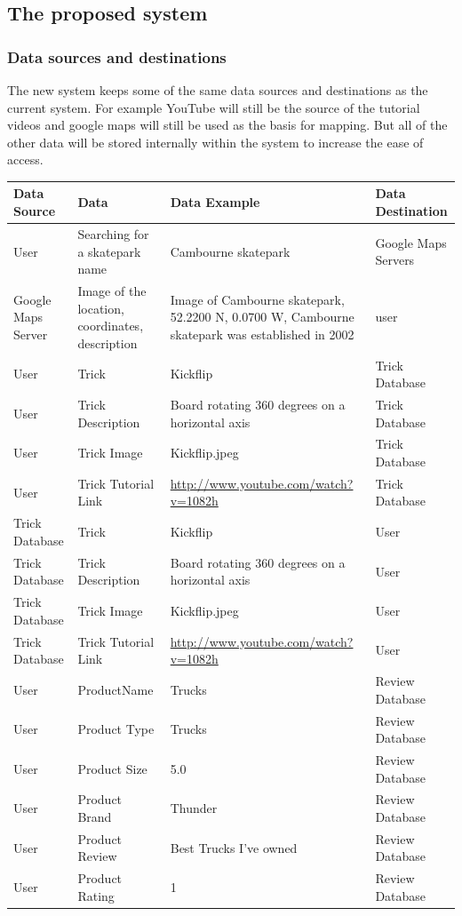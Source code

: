\subsection{The proposed system}

\subsubsection{Data sources and destinations}

The new system keeps some of the same data sources and destinations as the current system. For example YouTube will still be the source of the tutorial videos and google maps will still be used as the basis for mapping. But all of the other data will be stored internally within the system to increase the ease of access. 
\begin{center}
\begin{tabular}{|p{3cm}|p{3cm}|p{3cm}|p{3cm}|}
    \hline
 \textbf{Data Source} & \textbf{Data} & \textbf{Data Example} & \textbf{Data Destination}\\ \hline
User & Searching for a skatepark name & Cambourne skatepark & Google Maps Servers \\ \hline
Google Maps Server & Image of the location, coordinates, description & Image of Cambourne skatepark, 52.2200 N, 0.0700 W, Cambourne skatepark was established in 2002 & user \\ \hline 

User & Trick & Kickflip & Trick Database \\ \hline
User & Trick Description & Board rotating 360 degrees on a horizontal axis & Trick Database  \\ \hline
User & Trick Image & Kickflip.jpeg & Trick Database \\ \hline
User & Trick Tutorial Link & \url{ http://www.youtube.com/watch?v=1082h} & Trick Database \\ \hline


Trick Database & Trick & Kickflip & User \\ \hline
Trick Database & Trick Description & Board rotating 360 degrees on a horizontal axis & User  \\ \hline
Trick Database & Trick Image & Kickflip.jpeg & User \\ \hline
Trick Database & Trick Tutorial Link & \url{http://www.youtube.com/watch?v=1082h} & User \\ \hline

User & ProductName &  Trucks & Review Database \\ \hline 
User & Product Type & Trucks & Review Database \\ \hline
User & Product Size & 5.0 & Review Database \\ \hline
User & Product Brand & Thunder & Review Database \\ \hline
User & Product Review & Best Trucks I've owned & Review Database \\ \hline 
User & Product Rating & 1 & Review Database \\ \hline 


\end{tabular}
\end{center}
